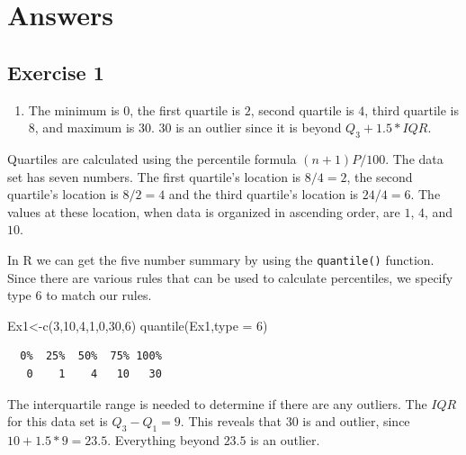\documentclass[
  letterpaper,
  DIV=11,
  numbers=noendperiod]{scrreprt}
\newenvironment{Shaded}{\begin{snugshade}}{\end{snugshade}}
\newcommand{\AttributeTok}[1]{\textcolor[rgb]{0.40,0.45,0.13}{#1}}
\newcommand{\DecValTok}[1]{\textcolor[rgb]{0.68,0.00,0.00}{#1}}
\newcommand{\FunctionTok}[1]{\textcolor[rgb]{0.28,0.35,0.67}{#1}}
\newcommand{\NormalTok}[1]{\textcolor[rgb]{0.00,0.23,0.31}{#1}}
\newcommand{\OtherTok}[1]{\textcolor[rgb]{0.00,0.23,0.31}{#1}}
\providecommand{\tightlist}{%
  \setlength{\itemsep}{0pt}\setlength{\parskip}{0pt}}\usepackage{longtable,booktabs,array}
\begin{document}
\hypertarget{answers-4}{%
\section{Answers}\label{answers-4}}

\hypertarget{exercise-1-9}{%
\subsection*{Exercise 1}\label{exercise-1-9}}

\begin{enumerate}
\def\labelenumi{\arabic{enumi}.}
\tightlist
\item
  The minimum is \(0\), the first quartile is \(2\), second quartile is
  \(4\), third quartile is \(8\), and maximum is \(30\). \(30\) is an
  outlier since it is beyond \(Q_{3}+1.5*IQR\).
\end{enumerate}

Quartiles are calculated using the percentile formula \((n+1)P/100\).
The data set has seven numbers. The first quartile's location is
\(8/4=2\), the second quartile's location is \(8/2=4\) and the third
quartile's location is \(24/4=6\). The values at these location, when
data is organized in ascending order, are \(1\), \(4\), and \(10\).

In R we can get the five number summary by using the \texttt{quantile()}
function. Since there are various rules that can be used to calculate
percentiles, we specify type \(6\) to match our rules.

\begin{Shaded}
\begin{Highlighting}[numbers=left,,]
\NormalTok{Ex1}\OtherTok{\textless{}{-}}\FunctionTok{c}\NormalTok{(}\DecValTok{3}\NormalTok{,}\DecValTok{10}\NormalTok{,}\DecValTok{4}\NormalTok{,}\DecValTok{1}\NormalTok{,}\DecValTok{0}\NormalTok{,}\DecValTok{30}\NormalTok{,}\DecValTok{6}\NormalTok{)}
\FunctionTok{quantile}\NormalTok{(Ex1,}\AttributeTok{type =} \DecValTok{6}\NormalTok{)}
\end{Highlighting}
\end{Shaded}

\begin{verbatim}
  0%  25%  50%  75% 100% 
   0    1    4   10   30 
\end{verbatim}

The interquartile range is needed to determine if there are any
outliers. The \(IQR\) for this data set is \(Q_{3}-Q_{1}=9\). This
reveals that \(30\) is and outlier, since \(10+1.5*9=23.5\). Everything
beyond \(23.5\) is an outlier.
\end{document}
